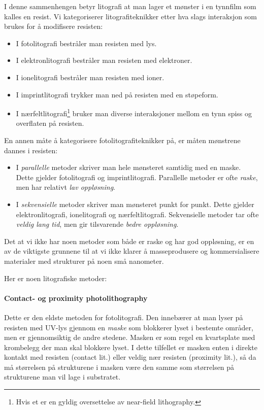 I denne sammenhengen betyr litografi at man lager et mønster i en tynnfilm som kalles en resist. Vi kategoriserer litografiteknikker etter hva slags interaksjon som brukes for å modifisere resisten:
\begin{itemize}
	\item I fotolitografi bestråler man resisten med lys.
	\item I elektronlitografi bestråler man resisten med elektroner.
	\item I ionelitografi bestråler man resisten med ioner.
	\item I imprintlitografi trykker man ned på resisten med en støpeform.
	\item I nærfeltlitografi\footnote{Hvis et er en gyldig oversettelse av near-field lithography.} bruker man diverse interaksjoner mellom en tynn spiss og overflaten på resisten.
\end{itemize}
En annen måte å kategorisere fotolitografiteknikker på, er måten mønstrene dannes i resisten:
\begin{itemize}
	\item I \emph{parallelle} metoder skriver man hele mønsteret samtidig med en maske. Dette gjelder fotolitografi og imprintlitografi. Parallelle metoder er ofte \emph{raske}, men har relativt \emph{lav oppløsning}.
	\item I \emph{sekvensielle} metoder skriver man mønsteret punkt for punkt. Dette gjelder elektronlitografi, ionelitografi og nærfeltlitografi. Sekvensielle metoder tar ofte \emph{veldig lang tid}, men gir tilsvarende \emph{bedre oppløsning}.
\end{itemize}
Det at vi ikke har noen metoder som både er raske og har god oppløsning, er en av de viktigste grunnene til at vi ikke klarer å masseprodusere og kommersialisere materialer med strukturer på noen små nanometer.

Her er noen litografiske metoder:
\paragraph{Contact- og proximity photolithography} Dette er den eldste metoden for fotolitografi. Den innebærer at man lyser på resisten med UV-lys gjennom en \emph{maske} som blokkerer lyset i bestemte områder, men er gjennomsiktig de andre stedene. Masken er som regel en kvartsplate med krombelegg der man skal blokkere lyset. I dette tilfellet er masken enten i direkte kontakt med resisten (contact lit.) eller veldig nær resisten (proximity lit.), så da må størrelsen på strukturene i masken være den samme som størrelsen på strukturene man vil lage i substratet.  

